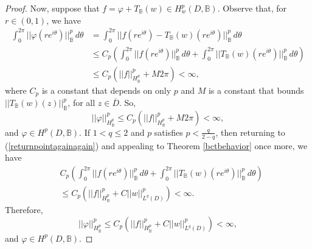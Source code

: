 \documentclass[10pt,a4paper]{amsart}
\newcommand{\bc}{\mathbb{B}}
\begin{document}
\begin{proof}
Now, suppose that $f = \varphi + T_\bc(w) \in H^p_{w}(D,\bc)$. Observe that, for $r \in (0,1)$, we have
\begin{align}
    \int_0^{2\pi} ||\varphi(re^{i\theta})||_\bc^p \,d\theta 
    &= \int_0^{2\pi} ||f(re^{i\theta}) - T_\bc(w)(re^{i\theta})||_\bc^p \,d\theta \nonumber \\
    &\leq C_p \left( \int_0^{2\pi} ||f(re^{i\theta})||_{\bc}^p \,d\theta + \int_0^{2\pi} || T_\bc(w)(re^{i\theta})||_\bc^p \,d\theta\right)  \label{returnpointagainagain}\\
    &\leq C_p\left( ||f||_{H^p_\bc}^p + M 2\pi\right)< \infty,\nonumber
\end{align}
where $C_p$ is a constant that depends on only $p$ and $M$ is a constant that bounds $||T_\bc(w)(z)||_\bc^p$, for all $z \in \overline{D}$. So, 
\[
||\varphi||_{H^p_\bc}^p \leq C_p\left( ||f||_{H^p_\bc}^p + M 2\pi\right)< \infty,
\]
and $\varphi \in H^p(D, \bc)$. If $1 < q \leq 2$ and $p$ satisfies $p < \frac{q}{2-q}$, then returning to (\ref{returnpointagainagain}) and appealing to Theorem \ref{bctbehavior} once more, we have 
\begin{align*}
&C_p \left( \int_0^{2\pi} ||f(re^{i\theta})||_{\bc}^p \,d\theta + \int_0^{2\pi} || T_\bc(w)(re^{i\theta})||_\bc^p \,d\theta\right) \\
&\leq C_p \left( ||f||^p_{H^p_\bc}  + C||w||^p_{L^q(D)}\right)  < \infty.
\end{align*}
Therefore, 
\[
    ||\varphi||^p_{H^p_\bc} \leq C_p \left(  ||f||^p_{H^p_\bc} + C||w||^p_{L^q(D)}\right)  < \infty,
\]
and $\varphi \in H^p(D,\bc)$. 

\end{proof}
\end{document}
